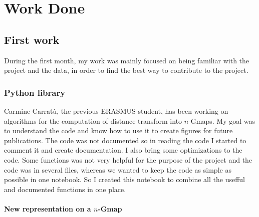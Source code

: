 \chapter{Work Done}
 
\section{First work}

During the first month, my work was mainly focused on being familiar with the
project and the data, in order to find the best way to contribute to the project.

\subsection{Python library}

Carmine Carratù, the previous ERASMUS student, has been working on algorithms for the
computation of distance transform into $n$-Gmaps. My goal was to understand the code
and know how to use it to create figures for future publications. The code was not
documented so in reading the code I started to comment it and create documentation.
I also bring some optimizations to the code. Some functions was not very helpful for
the purpose of the project and the code was in several files, whereas we wanted to
keep the code as simple as possible in one notebook. So I created this notebook to
combine all the usefful and documented functions in one place.

\subsubsection{New representation on a $n$-Gmap}

